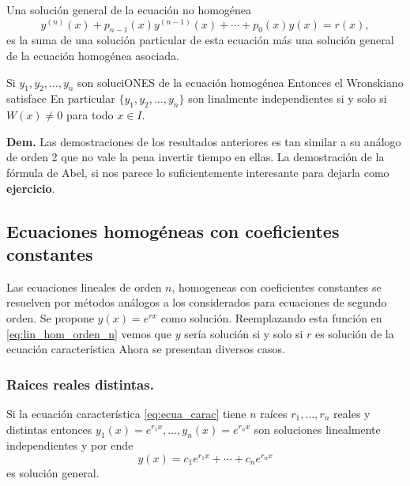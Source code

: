 \begin{teorema}
Una solución general de la ecuación no homogénea
\[y^{(n)}(x)+p_{n-1}(x)y^{(n-1)}(x)+\cdots+p_0(x)y(x)=r(x),\]
es la suma de una solución particular de esta ecuación más una solución general de la ecuación homogénea asociada.
\end{teorema}






\begin{teorema}
Si $y_1,y_2,\ldots,y_n$ son soluciONES de la ecuación  homogénea
Entonces el Wronskiano satisface
En particular  $\{y_1,y_2,\ldots,y_n\}$ son linalmente independientes si y solo si $W(x)\neq 0$ para todo $x\in I$.
\end{teorema}

\textbf{Dem.} Las demostraciones de los resultados anteriores es tan similar a su análogo de orden 2 que no vale la pena invertir tiempo en ellas. La demostración de la fórmula de Abel, si nos parece lo suficientemente interesante para dejarla como \textbf{ejercicio}.



\subsection{Ecuaciones homogéneas con coeficientes constantes}
Las ecuaciones lineales de orden $n$, homogeneas con coeficientes constantes  se resuelven por métodos análogos a los considerados para ecuaciones de segundo orden. Se propone $y(x)=e^{rx}$ como solución. Reemplazando esta función
en \eqref{eq:lin_hom_orden_n} vemos que $y$ sería solución si y solo si $r$ es solución de la ecuación característica
Ahora se presentan diversos casos.



\subsubsection{Raices reales distintas.} Si la ecuación característica \eqref{eq:ecua_carac} tiene $n$ raíces $r_1,\ldots,r_n$ reales y distintas entonces
$y_1(x)=e^{r_1x},\ldots,y_n(x)=e^{r_nx}$ son soluciones linealmente independientes y por ende
\[\boxed{y(x)=c_1e^{r_1x}+\cdots+c_ne^{r_nx}}\]
es solución general.

